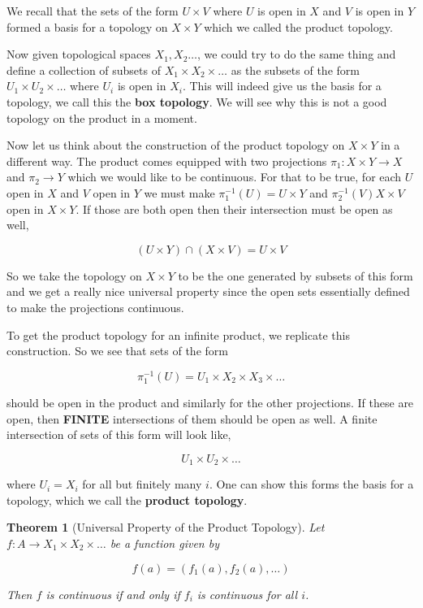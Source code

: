 \documentclass[a4paper]{article}
\newtheorem{theorem}{Theorem}
\numberwithin{theorem}{section}
\begin{document}
We recall that the sets of the form $U \times V$ where $U$ is open in $X$ and $V$ is open in $Y$ formed a basis for a topology on $X \times Y$ which we called the product topology. 

Now given topological spaces $X_1,X_2 \dots$, we could try to do the same thing and define a collection of subsets of $X_1 \times X_2 \times \dots$ as the subsets of the form $U_1 \times U_2 \times \dots$ where $U_i$ is open in $X_i$. This will indeed give us the basis for a topology, we call this the \textbf{box topology}. We will see why this is not a good topology on the product in a moment.

Now let us think about the construction of the product topology on $X \times Y$ in a different way. The product comes equipped with two projections $\pi_1: X \times Y \rightarrow X$ and $\pi_2 \rightarrow Y$ which we would like to be continuous. For that to be true, for each $U$ open in $X$ and $V$ open in $Y$ we must make $\pi_1^{-1}(U) = U \times Y$ and $\pi_2^{-1}(V) X \times V$ open in $X \times Y$. If those are both open then their intersection must be open as well,

$$ (U \times Y) \cap (X \times V) = U \times V $$

So we take the topology on $X \times Y$ to be the one generated by subsets of this form and we get a really nice universal property since the open sets essentially defined to make the projections continuous.

To get the product topology for an infinite product, we replicate this construction. So we see that sets of the form 

$$ \pi_1^{-1}(U) = U_1 \times X_2 \times X_3 \times \dots $$

should be open in the product and similarly for the other projections. If these are open, then \textbf{FINITE} intersections of them should be open as well. A finite intersection of sets of this form will look like,

$$ U_1 \times U_2 \times \dots $$

where $U_i = X_i$ for all but finitely many $i$. One can show this forms the basis for a topology, which we call the \textbf{product topology}.

\begin{theorem}[Universal Property of the Product Topology]
Let $f: A \rightarrow X_1 \times X_2 \times \dots$ be a function given by 

$$ f(a) = (f_1(a),f_2(a),\dots) $$

Then $f$ is continuous if and only if $f_i$ is continuous for all $i$.

\end{theorem}
\end{document}
